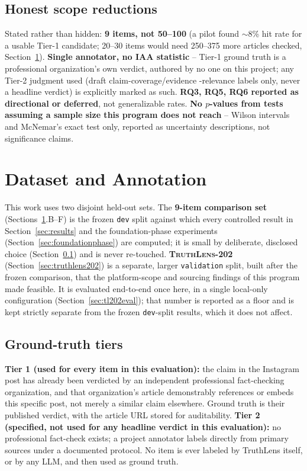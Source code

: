 \documentclass[conference]{IEEEtran}
\begin{document}
\subsection{Honest scope reductions}
\label{sec:honestscope}
Stated rather than hidden: \textbf{9 items, not 50--100} (a pilot found
$\sim$8\% hit rate for a usable Tier-1 candidate; 20--30 items would need
250--375 more articles checked, Section~\ref{sec:dataset}).
\textbf{Single annotator, no IAA statistic} -- Tier-1 ground truth is a
professional organization's own verdict, authored by no one on this
project; any Tier-2 judgment used (draft claim-coverage/evidence
-relevance labels only, never a headline verdict) is explicitly marked as
such. \textbf{RQ3, RQ5, RQ6 reported as directional or deferred}, not
generalizable rates. \textbf{No $p$-values from tests assuming a sample
size this program does not reach} -- Wilson intervals and McNemar's exact
test only, reported as uncertainty descriptions, not significance claims.

\section{Dataset and Annotation}
\label{sec:dataset}

This work uses two disjoint held-out sets. The \textbf{9-item comparison
set} (Sections~\ref{sec:dataset}.B--F) is the frozen \texttt{dev} split
against which every controlled result in Section~\ref{sec:results} and the
foundation-phase experiments (Section~\ref{sec:foundationphase}) are
computed; it is small by deliberate, disclosed choice
(Section~\ref{sec:honestscope}) and is never re-touched.
\textbf{\textsc{TruthLens-202}} (Section~\ref{sec:truthlens202}) is a
separate, larger \texttt{validation} split, built after the frozen
comparison, that the platform-scope and sourcing findings of this program
made feasible. It is evaluated end-to-end once here, in a single
local-only configuration (Section~\ref{sec:tl202eval}); that number is
reported as a floor and is kept strictly separate from the frozen
\texttt{dev}-split results, which it does not affect.

\subsection{Ground-truth tiers}
\textbf{Tier 1 (used for every item in this evaluation):} the claim in the
Instagram post has already been verdicted by an independent professional
fact-checking organization, and that organization's article demonstrably
references or embeds this specific post, not merely a similar claim
elsewhere. Ground truth is their published verdict, with the article URL
stored for auditability. \textbf{Tier 2 (specified, not used for any
headline verdict in this evaluation):} no professional fact-check exists;
a project annotator labels directly from primary sources under a documented
protocol. No item is ever labeled by TruthLens itself, or by any LLM, and
then used as ground truth.
\end{document}
